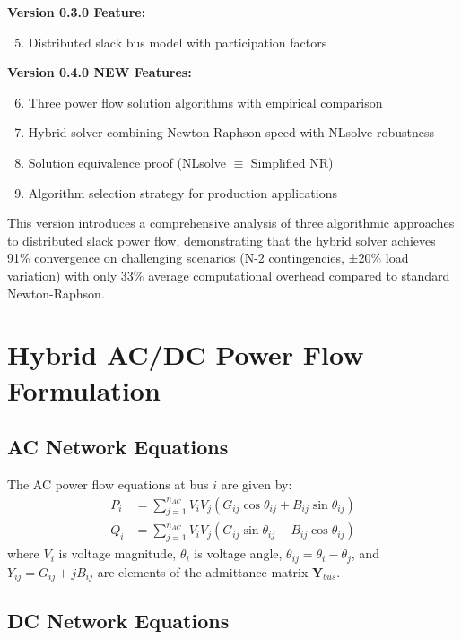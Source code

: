 \documentclass[11pt]{article}
\begin{document}
\textbf{Version 0.3.0 Feature:}
\begin{enumerate}
    \setcounter{enumi}{4}
    \item Distributed slack bus model with participation factors
\end{enumerate}

\textbf{Version 0.4.0 NEW Features:}
\begin{enumerate}
    \setcounter{enumi}{5}
    \item Three power flow solution algorithms with empirical comparison
    \item Hybrid solver combining Newton-Raphson speed with NLsolve robustness
    \item Solution equivalence proof (NLsolve $\equiv$ Simplified NR)
    \item Algorithm selection strategy for production applications
\end{enumerate}

This version introduces a comprehensive analysis of three algorithmic approaches to distributed slack power flow, demonstrating that the hybrid solver achieves 91\% convergence on challenging scenarios (N-2 contingencies, ±20\% load variation) with only 33\% average computational overhead compared to standard Newton-Raphson.

\section{Hybrid AC/DC Power Flow Formulation}

\subsection{AC Network Equations}

The AC power flow equations at bus $i$ are given by:
\begin{align}
P_i &= \sum_{j=1}^{n_{AC}} V_i V_j (G_{ij} \cos\theta_{ij} + B_{ij} \sin\theta_{ij}) \label{eq:ac_p} \\
Q_i &= \sum_{j=1}^{n_{AC}} V_i V_j (G_{ij} \sin\theta_{ij} - B_{ij} \cos\theta_{ij}) \label{eq:ac_q}
\end{align}
where $V_i$ is voltage magnitude, $\theta_i$ is voltage angle, $\theta_{ij} = \theta_i - \theta_j$, and $Y_{ij} = G_{ij} + jB_{ij}$ are elements of the admittance matrix $\mathbf{Y}_{bus}$.

\subsection{DC Network Equations}
\end{document}
